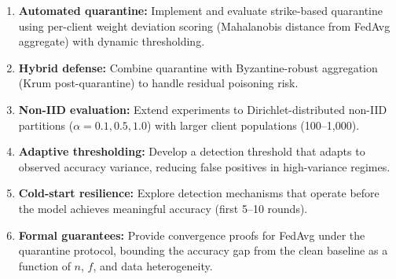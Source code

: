 \documentclass[conference]{IEEEtran}
\begin{document}
\begin{enumerate}
    \item \textbf{Automated quarantine:} Implement and evaluate strike-based quarantine using per-client weight deviation scoring (Mahalanobis distance from FedAvg aggregate) with dynamic thresholding.
    \item \textbf{Hybrid defense:} Combine quarantine with Byzantine-robust aggregation (Krum post-quarantine) to handle residual poisoning risk.
    \item \textbf{Non-IID evaluation:} Extend experiments to Dirichlet-distributed non-IID partitions ($\alpha = 0.1, 0.5, 1.0$) with larger client populations (100--1,000).
    \item \textbf{Adaptive thresholding:} Develop a detection threshold that adapts to observed accuracy variance, reducing false positives in high-variance regimes.
    \item \textbf{Cold-start resilience:} Explore detection mechanisms that operate before the model achieves meaningful accuracy (first 5--10 rounds).
    \item \textbf{Formal guarantees:} Provide convergence proofs for FedAvg under the quarantine protocol, bounding the accuracy gap from the clean baseline as a function of $n$, $f$, and data heterogeneity.
\end{enumerate}
\end{document}
